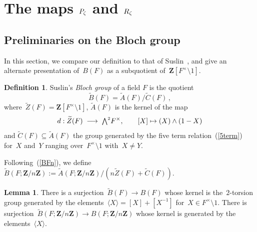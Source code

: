 \documentclass[12pt,reqno]{amsart}
\theoremstyle{definition}
\newtheorem{lemma}[theorem]{Lemma}
\newtheorem{definition}[theorem]{Definition}
\newcommand{\frankchanged}[1]{{#1}}
\newcommand{\newfrankchanged}[1]{{#1}}
\def\BB{\widetilde{B}}
\def\CC{\widetilde{C}}
\def\ZZ{\widetilde{Z}}
\def\AA{\widetilde{A}}
\def\Z{\mathbf Z}   %
\def\wed{\small{\bigwedge}^2}
\def\wed{\mbox{\small$\bigwedge^2$}}
\def\map{\;\longrightarrow\;}
\def\nn{n}
\begin{document}

\section{The maps \texorpdfstring{$P_\zeta$}{Pz} and  
\texorpdfstring{$R_\zeta$}{Rz}}
\label{sec.PR}

\frankchanged{
\subsection{Preliminaries on the Bloch group}

In this section, we compare our definition to that of Suslin~\cite[\S1]{Suslintwo},
and give an alternate presentation of~$B(F)$ as a subquotient of~$\Z[F^{\times} \setminus 1]$.


\begin{definition}
\label{def.BFsuslin} 
Suslin's {\it Bloch group} of a field $F$ is the quotient 
$$
\BB(F)=\AA(F)/\CC(F)\,, 
$$
where~$\ZZ(F) = \Z[F^{\times} \setminus 1]$,  $\AA(F)$ is the kernel of the map 
$$
d: \ZZ(F)\map \wed F^{\times}, \qquad [X] \mapsto (X) \wedge (1-X) 
$$
and $\CC(F)\subseteq \AA(F)$ the group 
generated by the five term relation~(\ref{5term})
for~$X$ and~$Y$ ranging over~$F^{\times} \setminus 1$ with~$X \ne Y$.
\end{definition}

\newfrankchanged{Following~(\ref{BFn}), we define~$\BB(F;\Z/\nn\Z):=\AA(F;\Z/\nn\Z)/(n \ZZ(F) + \CC(F))$.}




\begin{lemma} \label{suslincomparison}
There is a surjection~$\BB(F) \rightarrow B(F)$ 
whose kernel is the~$2$-torsion
group generated by the elements~$\langle X \rangle = [X] + [X^{-1}]$ for~$X \in F^{\times} \setminus 1$.
\newfrankchanged{There is surjection~$\BB(F;\Z/\nn\Z) \rightarrow B(F;\Z/\nn\Z)$ whose
kernel is generated by the elements~$\langle X \rangle$.}
\end{lemma}

}
\end{document}
